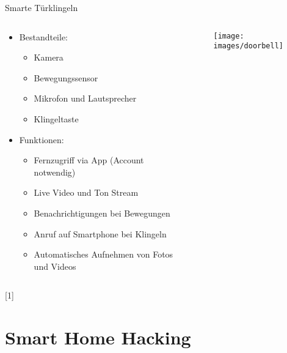 \documentclass[11pt, aspectratio=169, modernfonts]{beamer}
\begin{document}
    \begin{frame}{Smarte Türklingeln}
        \begin{columns}
            \begin{column}{0.6\textwidth}
                \begin{itemize}
                    \item Bestandteile:
                    \begin{itemize}
                        \item Kamera
                        \item Bewegungssensor
                        \item Mikrofon und Lautsprecher
                        \item Klingeltaste
                    \end{itemize}
                    \vspace{0.2cm}
                    \item Funktionen:
                    \begin{itemize}
                        \item Fernzugriff via App (Account notwendig)
                        \item Live Video und Ton Stream
                        \item Benachrichtigungen bei Bewegungen
                        \item Anruf auf Smartphone bei Klingeln
                        \item Automatisches Aufnehmen von Fotos und Videos
                    \end{itemize}
                \end{itemize}
            \end{column}

            \begin{column}{0.4\textwidth}
                \begin{figure}
                    \centering
                    \texttt{[image: images/doorbell]}\label{fig:doorbell}
                \end{figure}
            \end{column}
        \end{columns}
        \hfill [1]
    \end{frame}


    \section{Smart Home Hacking}\label{sec:smart-home-hacking}
\end{document}
